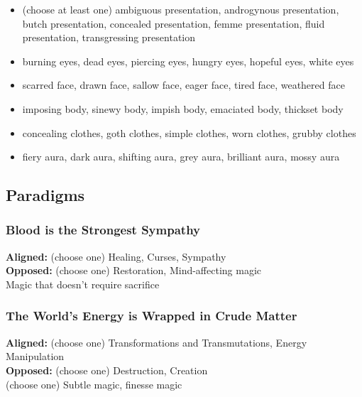 \documentclass[10pt,twoside,openright]{memoir}
\begin{document}
\begin{itemize}
\tightlist
\item
  (choose at least one) ambiguous presentation, androgynous
  presentation, butch presentation, concealed presentation, femme
  presentation, fluid presentation, transgressing presentation
\item
  burning eyes, dead eyes, piercing eyes, hungry eyes, hopeful eyes,
  white eyes
\item
  scarred face, drawn face, sallow face, eager face, tired face,
  weathered face
\item
  imposing body, sinewy body, impish body, emaciated body, thickset body
\item
  concealing clothes, goth clothes, simple clothes, worn clothes, grubby
  clothes
\item
  fiery aura, dark aura, shifting aura, grey aura, brilliant aura, mossy
  aura
\end{itemize}

\hypertarget{paradigms-5}{%
\subsection{Paradigms}\label{paradigms-5}}

\hypertarget{blood-is-the-strongest-sympathy}{%
\subsubsection{Blood is the Strongest
Sympathy}\label{blood-is-the-strongest-sympathy}}

\textbf{Aligned:} (choose one) Healing, Curses, Sympathy\\
\textbf{Opposed:} (choose one) Restoration, Mind-affecting magic\\
Magic that doesn't require sacrifice

\hypertarget{the-worlds-energy-is-wrapped-in-crude-matter}{%
\subsubsection{The World's Energy is Wrapped in Crude
Matter}\label{the-worlds-energy-is-wrapped-in-crude-matter}}

\textbf{Aligned:} (choose one) Transformations and Transmutations,
Energy Manipulation\\
\textbf{Opposed:} (choose one) Destruction, Creation\\
(choose one) Subtle magic, finesse magic
\end{document}
